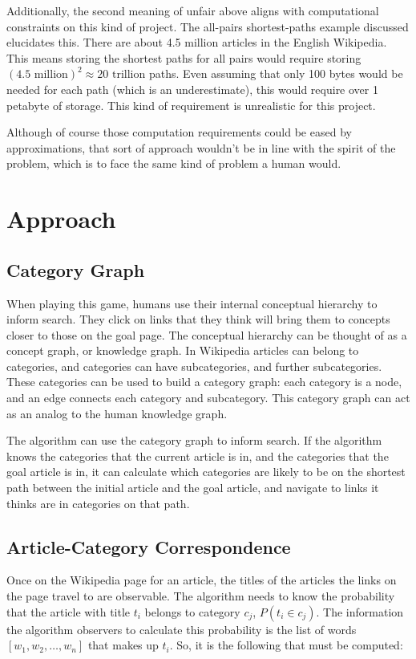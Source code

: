 \documentclass{article}
\begin{document}
Additionally, the second meaning of unfair above aligns with computational
constraints on this kind of project. The all-pairs shortest-paths example
discussed elucidates this. There are about 4.5 million articles in the English
Wikipedia. This means storing the shortest paths for all pairs would require
storing $(4.5 \text{ million})^2 \approx 20 \text{ trillion}$ paths. Even
assuming that only 100 bytes would be needed for each path (which is an
underestimate), this would require over 1 petabyte of storage. This kind of
requirement is unrealistic for this project.

Although of course those computation requirements could be eased by
approximations, that sort of approach wouldn't be in line with the spirit of the
problem, which is to face the same kind of problem a human would.

\section{Approach}
\subsection{Category Graph}
When playing this game, humans use their internal conceptual hierarchy to inform
search. They click on links that they think will bring them to concepts closer
to those on the goal page. The conceptual hierarchy can be thought of as a
concept graph, or knowledge graph. In Wikipedia articles can belong to
categories, and categories can have subcategories, and further subcategories.
These categories can be used to build a category graph: each category is a node,
and an edge connects each category and subcategory. This category graph can act
as an analog to the human knowledge graph.

The algorithm can use the category graph to inform search. If the algorithm
knows the categories that the current article is in, and the categories that the
goal article is in, it can calculate which categories are likely to be on the shortest path
between the initial article and the goal article, and navigate to links it
thinks are in categories on that path.

\subsection{Article-Category Correspondence}
Once on the Wikipedia page for an article, the titles of the articles the links
on the page travel to are observable. The algorithm needs to know the probability
that the article with title $t_i$ belongs to category $c_j$, $P(t_i \in c_j)$.
The information the algorithm observers to calculate this probability is the
list of words $[w_1, w_2, \dots, w_n]$ that makes up $t_i$.  So, it is the following
that must be computed:
\end{document}
